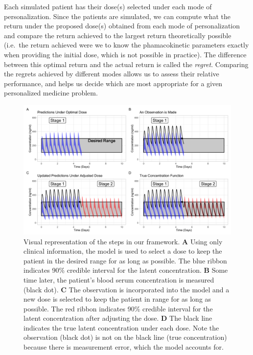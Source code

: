 Each simulated patient has their dose(s) selected under each mode of personalization.  Since the patients are simulated, we can compute what the return under the proposed dose(s) obtained from each mode of personalization and compare the return achieved to the largest return theoretically possible (i.e.\ the return achieved were we to know the phamacokinetic parameters exactly when providing the initial dose, which is not possible in practice). The difference between this optimal return and the actual return is called the \textit{regret}. Comparing the regrets achieved by different modes allows us to assess their relative performance, and helps us decide which are most appropriate for a given personalized medicine problem.

\begin{figure}
	\centering
	\includegraphics[width=1\linewidth]{figures/viz_of_process.png}
	\caption{
	Visual representation of the steps in our framework.	\textbf{A}  Using only clinical information, the model is used to select a dose to keep the patient in the desired range for as long as possible. The blue ribbon indicates 90\% credible interval for the latent concentration.  \textbf{B} Some time later, the patient's blood serum concentration is measured (black dot). \textbf{C}  The observation is incorporated into the model and a new dose is selected to keep the patient in range for as long as possible. The red ribbon indicates 90\% credible interval for the latent concentration after adjusting the dose. \textbf{D} The black line indicates the true latent concentration under each dose.  Note the observation (black dot) is not on the black line (true concentration) because there is measurement error, which the model accounts for.
}
	\label{fig:processfiguresingle}
\end{figure}

